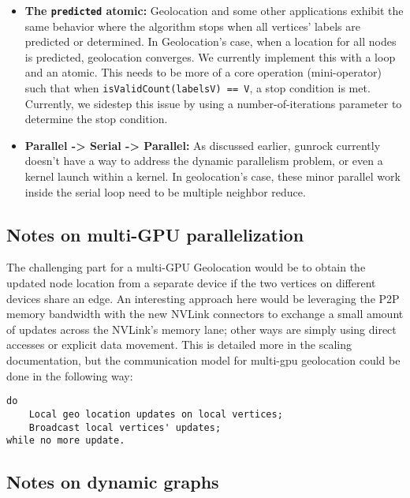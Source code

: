 \documentclass[10pt,oneside]{memoir}
\begin{document}
\begin{itemize}
\item
  \textbf{The \texttt{predicted} atomic:} Geolocation and some other
  applications exhibit the same behavior where the algorithm stops when
  all vertices' labels are predicted or determined. In Geolocation's
  case, when a location for all nodes is predicted, geolocation
  converges. We currently implement this with a loop and an atomic. This
  needs to be more of a core operation (mini-operator) such that when
  \texttt{isValidCount(labels\textbar{}V\textbar{})\ ==\ \textbar{}V\textbar{}},
  a stop condition is met. Currently, we sidestep this issue by using a
  number-of-iterations parameter to determine the stop condition.
\item
  \textbf{Parallel -\textgreater{} Serial -\textgreater{} Parallel:} As
  discussed earlier, gunrock currently doesn't have a way to address the
  dynamic parallelism problem, or even a kernel launch within a kernel.
  In geolocation's case, these minor parallel work inside the serial
  loop need to be multiple neighbor reduce.
\end{itemize}

\hypertarget{notes-on-multi-gpu-parallelization-1}{%
\subsection{Notes on multi-GPU
parallelization}\label{notes-on-multi-gpu-parallelization-1}}

The challenging part for a multi-GPU Geolocation would be to obtain the
updated node location from a separate device if the two vertices on
different devices share an edge. An interesting approach here would be
leveraging the P2P memory bandwidth with the new NVLink connectors to
exchange a small amount of updates across the NVLink's memory lane;
other ways are simply using direct accesses or explicit data movement.
This is detailed more in the scaling documentation, but the
communication model for multi-gpu geolocation could be done in the
following way:

\begin{verbatim}
do
    Local geo location updates on local vertices;
    Broadcast local vertices' updates;
while no more update.
\end{verbatim}

\hypertarget{notes-on-dynamic-graphs-1}{%
\subsection{Notes on dynamic graphs}\label{notes-on-dynamic-graphs-1}}
\end{document}
